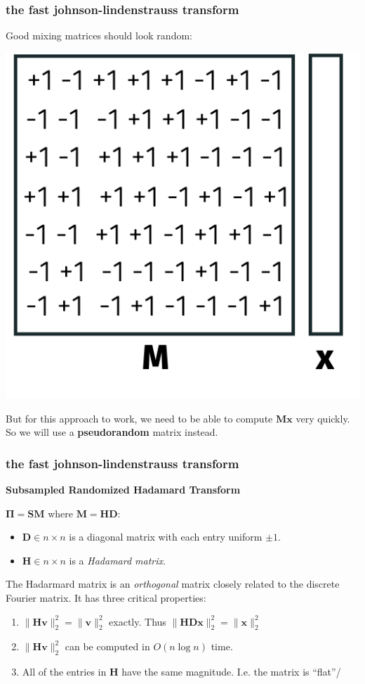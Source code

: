 \documentclass[compress]{beamer}
\newcommand{\bs}[1]{\boldsymbol{#1}}
\newcommand{\bv}[1]{\mathbf{#1}}
\begin{document}
\begin{frame}[t]
	\frametitle{the fast johnson-lindenstrauss transform}
	Good mixing matrices should look random:
	\begin{center}
		\includegraphics[width=.4\textwidth]{mixing.png}
		
		{But for this approach to work, we need to be able to compute $\bv{M}\bv{x}$ very quickly.} So we will use a \textbf{\alert{pseudorandom}} matrix instead.
	\end{center}
	
\end{frame}

\begin{frame}[t]
	\frametitle{the fast johnson-lindenstrauss transform}
	\begin{center}
		\textbf{Subsampled Randomized Hadamard Transform}
	\end{center}
	$\bs{\Pi} = \bv{SM}$ where $\bv{M} = \bv{H}\bv{D}$:
	\begin{itemize}
		\item $\bv{D} \in n \times n$ is a diagonal matrix with each entry uniform $\pm 1$.
		\item $\bv{H} \in n \times n$ is a \emph{Hadamard matrix}.
	\end{itemize}

The Hadarmard matrix is an \emph{orthogonal} matrix closely related to the discrete Fourier matrix. It has three critical properties: 
\begin{enumerate}
	\item $\|\bv{H}\bv{v}\|_2^2 = \|\bv{v}\|_2^2$ exactly. Thus $\|\bv{H}\bv{D}\bv{x}\|_2^2 = \|\bv{x}\|_2^2$ 
	\item $\|\bv{H}\bv{v}\|_2^2$ can be computed in $O(n\log n)$ time. 
	\item All of the entries in $\bv{H}$ have the same magnitude. I.e. the matrix is ``flat''/
\end{enumerate}
\end{frame}
\end{document}
